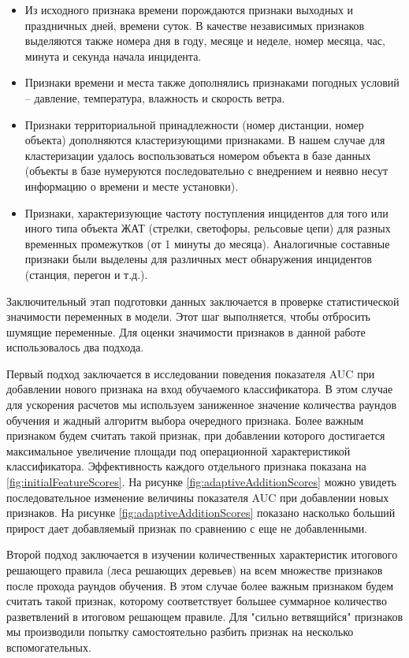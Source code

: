 \begin{itemize}
\item Из исходного признака времени порождаются признаки выходных и праздничных дней, времени суток. В качестве независимых признаков выделяются также номера дня в году, месяце и неделе, номер месяца, час, минута и секунда начала инцидента.
\item Признаки времени и места также дополнялись признаками погодных условий – давление, температура, влажность и скорость ветра.
\item Признаки территориальной принадлежности (номер дистанции, номер объекта) дополняются кластеризующими признаками. В нашем случае для кластеризации удалось воспользоваться номером объекта в базе данных (объекты в базе нумеруются последовательно с внедрением и неявно несут информацию о времени и месте установки).
\item Признаки, характеризующие частоту поступления инцидентов для того или иного типа объекта ЖАТ (стрелки, светофоры, рельсовые цепи) для разных временных промежутков (от 1 минуты до месяца). Аналогичные составные признаки были выделены для различных мест обнаружения инцидентов (станция, перегон и т.д.).
\end{itemize}
Заключительный этап подготовки данных заключается в проверке статистической значимости переменных в модели. Этот шаг выполняется, чтобы отбросить шумящие переменные. Для оценки значимости признаков в данной работе использовалось два подхода.

Первый подход заключается в исследовании поведения показателя AUC при добавлении нового признака на вход обучаемого классификатора. В этом случае для ускорения расчетов мы используем заниженное значение количества раундов обучения и жадный алгоритм выбора очередного признака. Более важным признаком будем считать такой признак, при добавлении которого достигается максимальное увеличение площади под операционной характеристикой классификатора. Эффективность каждого отдельного признака показана на \ref{fig:initialFeatureScores}. На рисунке \ref{fig:adaptiveAdditionScores} можно увидеть последовательное изменение величины показателя AUC при добавлении новых признаков. На рисунке \ref{fig:adaptiveAdditionScores} показано насколько больший прирост дает добавляемый признак по сравнению с еще не добавленными.

Второй подход заключается в изучении количественных характеристик итогового решающего правила (леса решающих деревьев) на всем множестве признаков после прохода раундов обучения. В этом случае более важным признаком будем считать такой признак, которому соответствует большее суммарное количество разветвлений в итоговом решающем правиле. Для "сильно ветвящийся" признаков мы производили попытку самостоятельно разбить признак на несколько вспомогательных.

